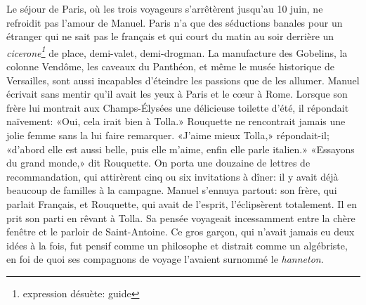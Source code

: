 Le séjour de Paris, où les trois voyageurs s'arrêtèrent jusqu'au 10 juin, ne refroidit pas l'amour de Manuel. Paris n'a que des séductions banales pour un étranger qui ne sait pas le français et qui court du matin au soir derrière un \emph{cicerone\footnote{expression désuète: guide}} de place, demi-valet, demi-drogman. La manufacture des Gobelins, la colonne Vendôme, les caveaux du Panthéon, et même le musée historique de Versailles, sont aussi incapables d'éteindre les passions que de les allumer. Manuel écrivait sans mentir qu'il avait les yeux à Paris et le c\oe{}ur à Rome. Lorsque son frère lui montrait aux Champs-Élysées une délicieuse toilette d'été, il répondait naïvement: «Oui, cela irait bien à Tolla.» Rouquette ne rencontrait jamais une jolie femme sans la lui faire remarquer. «J'aime mieux Tolla,» répondait-il; «d'abord elle est aussi belle, puis elle m'aime, enfin elle parle italien.» «Essayons du grand monde,» dit Rouquette. On porta une douzaine de lettres de recommandation, qui attirèrent cinq ou six invitations à dîner: il y avait déjà beaucoup de familles à la campagne. Manuel s'ennuya partout: son frère, qui parlait Français, et Rouquette, qui avait de l'esprit, l'éclipsèrent totalement. Il en prit son parti en rêvant à Tolla. Sa pensée voyageait incessamment entre la chère fenêtre et le parloir de Saint-Antoine. Ce gros garçon, qui n'avait jamais eu deux idées à la fois, fut pensif comme un philosophe et distrait comme un algébriste, en foi de quoi ses compagnons de voyage l'avaient surnommé le \emph{hanneton}.


